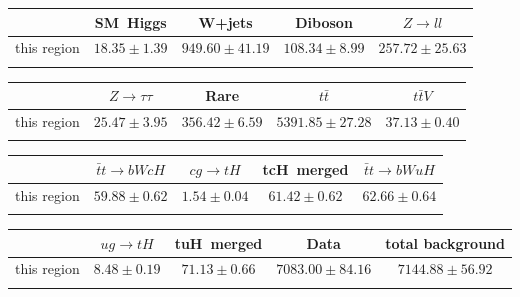 \centering
\begin{tabular}{ccccc} \toprule\toprule
 & SM~Higgs & W+jets & Diboson & $Z\to ll$\\\midrule
this region & $18.35\pm1.39$ & $949.60\pm41.19$ & $108.34\pm8.99$ & $257.72\pm25.63$\\
\bottomrule\bottomrule\\
\end{tabular}
\begin{tabular}{ccccc} \toprule\toprule
 & $Z\to \tau\tau$ & Rare & $t\bar{t}$ & $t\bar{t}V$\\\midrule
this region & $25.47\pm3.95$ & $356.42\pm6.59$ & $5391.85\pm27.28$ & $37.13\pm0.40$\\
\bottomrule\bottomrule\\
\end{tabular}
\begin{tabular}{ccccc} \toprule\toprule
 & $\bar{t}t\to bWcH$ & $cg\to tH$ & tcH~merged & $\bar{t}t\to bWuH$\\\midrule
this region & $59.88\pm0.62$ & $1.54\pm0.04$ & $61.42\pm0.62$ & $62.66\pm0.64$\\
\bottomrule\bottomrule\\
\end{tabular}
\begin{tabular}{ccccc} \toprule\toprule
 & $ug\to tH$ & tuH~merged & Data & total background\\\midrule
this region & $8.48\pm0.19$ & $71.13\pm0.66$ & $7083.00\pm84.16$ & $7144.88\pm56.92$\\
\bottomrule\bottomrule\\
\end{tabular}
